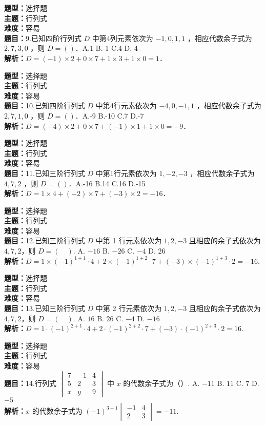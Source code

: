 \documentclass{ctexart}
\newenvironment{question}[5]{%
	\noindent\textbf{题型：}#1\\
	\textbf{主题：}#2\\
	\textbf{难度：}#3\\
	\textbf{题目：}#4\\
	\textbf{解析：}#5\\
	\vspace{1em}
}{}
\begin{document}
	\begin{question}
		{选择题}
		{行列式}
		{容易}
		{9.已知四阶行列式 \(D\) 中第4列元素依次为 \(-1,0,1,1\) ，相应代数余子式为 \(2,7,3,0\) ，则 \(D=(  )\)．A.1 B.-1 C.4 D.-4}
		{\(D = (-1) \times 2 + 0 \times 7 + 1 \times 3 + 1 \times 0 = 1\)．}
	\end{question}
	
	\begin{question}
		{选择题}
		{行列式}
		{容易}
		{10.已知四阶行列式 \(D\) 中第4行元素依次为 \(-4,0,-1,1\) ，相应代数余子式为 \(2,7,1,0\) ，则 \(D=(  )\)．A.-9 B.-10 C.7 D.-7}
		{\(D = (-4) \times 2 + 0 \times 7 + (-1) \times 1 + 1 \times 0 = -9\)．}
	\end{question}
	
	\begin{question}
		{选择题}
		{行列式}
		{容易}
		{11.已知三阶行列式 \(D\) 中第1行元素依次为 \(1,-2,-3\) ，相应代数余子式为 \(4,7,2\) ，则 \(D=(  )\)．A.-16 B.14 C.16 D.-15}
		{\(D = 1 \times 4 + (-2) \times 7 + (-3) \times 2 = -16\)．}
	\end{question}
	
	
	\begin{question}
		{选择题}
		{行列式}
		{容易}
		{12.已知三阶行列式 \(D\) 中第 1 行元素依次为 \(1,2,-3\) 且相应的余子式依次为 \(4,7,2\)，则 \(D=(\quad)\). A. \(-16\) \quad B. \(-26\) \quad C. \(-4\) \quad D. \(26\)}
		{\(D=1 \times(-1)^{1+1} \cdot 4 + 2 \times(-1)^{1+2} \cdot 7 + (-3) \times(-1)^{1+3} \cdot 2 = -16\). }
	\end{question}
	
	\begin{question}
		{选择题}
		{行列式}
		{容易}
		{13.已知三阶行列式 \(D\) 中第 2 行元素依次为 \(1,2,-3\) 且相应的余子式依次为 \(4,7,2\)，则 \(D=(\quad)\). A. \(16\) \quad B. \(26\) \quad C. \(-4\) \quad D. \(-16\)}
		{\(D=1 \cdot (-1)^{2+1} \cdot 4 + 2 \cdot (-1)^{2+2} \cdot 7 + (-3) \cdot (-1)^{2+3} \cdot 2 = 16\). }
	\end{question}
	
	\begin{question}
		{选择题}
		{行列式}
		{容易}
		{14.行列式 \(\begin{vmatrix}7 & -1 & 4 \\ 5 & 2 & 3 \\ x & y & 9\end{vmatrix}\) 中 \(x\) 的代数余子式为（\quad）. A. \(-11\) \quad B. \(11\) \quad C. \(7\) \quad D. \(-5\)}
		{\(x\) 的代数余子式为 \((-1)^{3+1} \begin{vmatrix}-1 & 4 \\ 2 & 3\end{vmatrix} = -11\). }
	\end{question}
	
\end{document}
